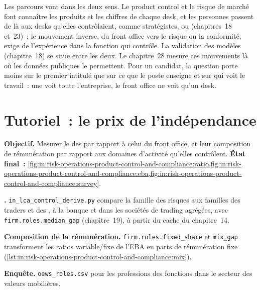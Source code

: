 Les parcours vont dans les deux sens. Le product control et le risque de marché font connaître les produits et les chiffres de chaque desk, et les personnes passent de
là aux desks qu'elles contrôlaient, comme stratégistes,  ou  (chapitres~18 et~23)~; le mouvement inverse,
du front office vers le risque ou la conformité, exige de l'expérience dans la fonction qui contrôle. La validation des modèles
(chapitre~18) se situe entre les deux. Le chapitre~28 mesure ces mouvements là où les données publiques le permettent. Pour un candidat, la question porte moins
sur le premier intitulé que sur ce que le poste enseigne et sur qui voit le travail~: une  voit toute l'entreprise, le front
office ne voit qu'un desk.

\section{Tutoriel~: le prix de l'indépendance}\label{tut:in:risk-operations-product-control-and-compliance:tut}

\begin{tutorial}
\textbf{Objectif.} Mesurer le  des  par rapport à celui du front office, et leur composition de rémunération par rapport aux
domaines d'activité qu'elles contrôlent.
\textbf{État final~:} \cref{fig:in:risk-operations-product-control-and-compliance:ratio,fig:in:risk-operations-product-control-and-compliance:eba,fig:in:risk-operations-product-control-and-compliance:survey}.
\begin{tutsteps}
\item \textbf{.} \texttt{in\_lca\_control\_derive.py} compare la famille des risques aux familles des traders et des
, à la banque et dans les sociétés de trading agrégées, avec \texttt{firm.roles.median\_gap} (chapitre~19), à
partir du cache du chapitre~14.
\item \textbf{Composition de la rémunération.} \texttt{firm.roles.fixed\_share} et \texttt{mix\_gap} transforment les ratios variable/fixe de l'EBA
en parts de rémunération fixe (\cref{lst:in:risk-operations-product-control-and-compliance:mix}).
\label{lst:in:risk-operations-product-control-and-compliance:mix}
\item \textbf{Enquête.} \texttt{oews\_roles.csv} pour les professions des fonctions dans le secteur des valeurs mobilières.
\end{tutsteps}
\end{tutorial}


